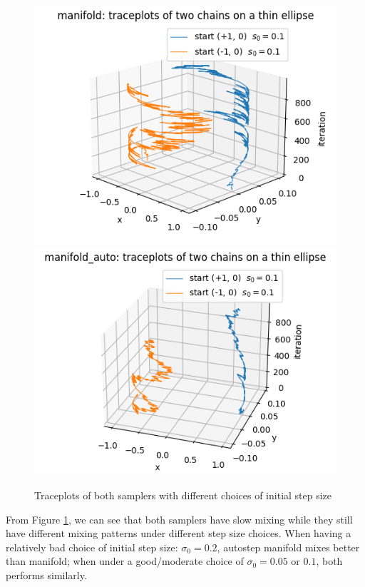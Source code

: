 \documentclass{article}
\begin{document}
\begin{figure}[H]
    \medskip 
    \begin{adjustbox}{width=0.5\textwidth}%
      \begin{minipage}[t]{\linewidth}
        \centering
        \includegraphics[width=.49\linewidth]{mixing_margin_s.png}\hfill
        \includegraphics[width=.49\linewidth]{mixing_auto_margin_s.png}
      \end{minipage}
    \end{adjustbox}
  
    \caption{Traceplots of both samplers with different choices of initial step size}
    \label{fig:mixing}
  \end{figure}
From Figure \ref{fig:mixing}, we can see that both samplers have slow mixing while they still have different mixing patterns under different step size choices. When having a relatively bad choice of initial step size: $\sigma_0 = 0.2$, autostep manifold mixes better than manifold; when under a good/moderate choice of $\sigma_0 = 0.05$ or $0.1$, both performs similarly.
\end{document}
